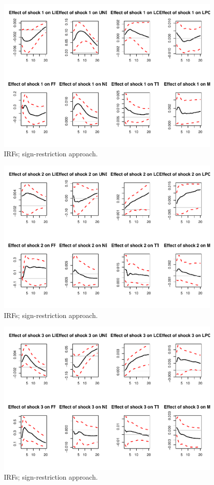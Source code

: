 \documentclass[
  12pt,
]{book}
\theoremstyle{definition}
\theoremstyle{definition}
\theoremstyle{definition}
\theoremstyle{definition}
\theoremstyle{remark}
\begin{document}
\begin{figure}
\includegraphics[width=0.95\linewidth]{IdentifStructShocks_files/figure-latex/signrestr2-1} \caption{IRFs; sign-restriction approach.}\label{fig:signrestr2-1}
\end{figure}
\begin{figure}
\includegraphics[width=0.95\linewidth]{IdentifStructShocks_files/figure-latex/signrestr2-2} \caption{IRFs; sign-restriction approach.}\label{fig:signrestr2-2}
\end{figure}
\begin{figure}
\includegraphics[width=0.95\linewidth]{IdentifStructShocks_files/figure-latex/signrestr2-3} \caption{IRFs; sign-restriction approach.}\label{fig:signrestr2-3}
\end{figure}
\end{document}
